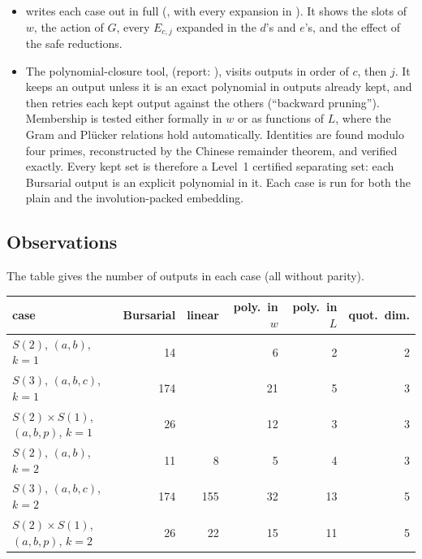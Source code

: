 \documentclass[11pt]{article}
\theoremstyle{definition}
\theoremstyle{remark}
\begin{document}
\begin{itemize}
  \item {} writes each case out in full
    (, with every expansion in
    ). It shows the slots of $w$, the action of
    $G$, every $E_{c,j}$ expanded in the $d$'s and $e$'s, and the effect of the
    safe reductions.
  \item The polynomial-closure tool, 
    (report: ), visits outputs
    in order of $c$, then $j$. It keeps an output unless it is an exact
    polynomial in outputs already kept, and then retries each kept output
    against the others (``backward pruning''). Membership is tested either
    formally in $w$ or as functions of $L$, where the Gram and Plücker relations
    hold automatically. Identities are found modulo four primes, reconstructed
    by the Chinese remainder theorem, and verified exactly. Every kept set is
    therefore a Level~1 certified separating set: each Bursarial output is an
    explicit polynomial in it. Each case is run for both the plain and the
    involution-packed embedding.
\end{itemize}

\subsection{Observations}

The table gives the number of outputs in each case (all without parity).

\begin{center}
\begin{tabular}{lrrrrr}
  case & Bursarial & linear & poly.\ in $w$ & poly.\ in $L$ & quot.\ dim. \\ \hline
  $S(2)$, $(a,b)$, $k=1$             & 14  &     & 6  & 2  & 2 \\
  $S(3)$, $(a,b,c)$, $k=1$           & 174 &     & 21 & 5  & 3 \\
  $S(2)\times S(1)$, $(a,b,p)$, $k=1$ & 26  &     & 12 & 3  & 3 \\
  $S(2)$, $(a,b)$, $k=2$             & 11  & 8   & 5  & 4  & 3 \\
  $S(3)$, $(a,b,c)$, $k=2$           & 174 & 155 & 32 & 13 & 5 \\
  $S(2)\times S(1)$, $(a,b,p)$, $k=2$ & 26  & 22  & 15 & 11 & 5
\end{tabular}
\end{center}
\end{document}
